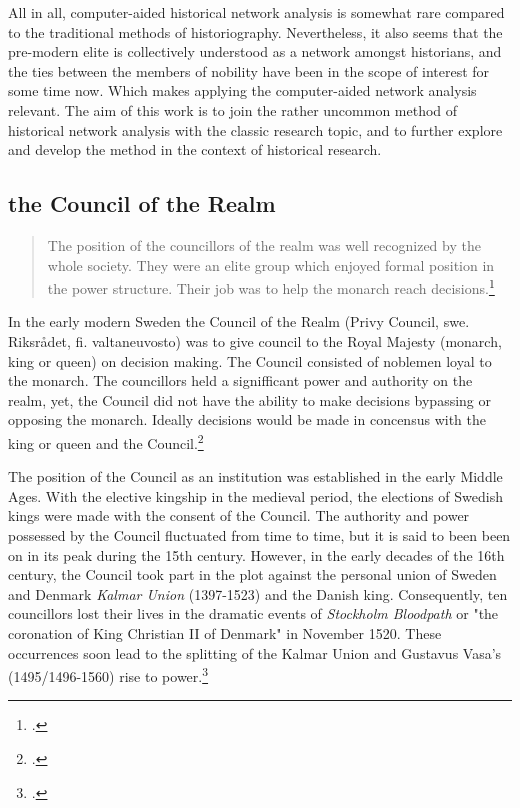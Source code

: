 All in all, computer-aided historical network analysis is somewhat rare compared to the traditional methods of historiography. Nevertheless, it also seems that the pre-modern elite is collectively understood as a network amongst historians, and the ties between the members of nobility have been in the scope of interest for some time now. Which makes applying the computer-aided network analysis relevant. The aim of this work is to join the rather uncommon method of historical network analysis with the classic research topic, and to further explore and develop the method in the context of historical research.

\subsection{the Council of the Realm}
\label{councilofrealm}
\begin{quote}
	The position of the councillors of the realm was well recognized by the whole society. They were an elite group which enjoyed formal position in the power structure. Their job was to help the monarch reach decisions.\footcite[p. 26.]{agencyAndStateBuilding}
\end{quote}

In the early modern Sweden the Council of the Realm (Privy Council, swe. Riksrådet, fi. valtaneuvosto) was to give council to the Royal Majesty (monarch, king or queen) on decision making. The Council consisted of noblemen loyal to the monarch. The councillors held a signifficant power and authority on the realm, yet, the Council did not have the ability to make decisions bypassing or opposing the monarch. Ideally decisions would be made in concensus with the king or queen and the Council.\footcites[pp. 13-14,]{hopesAndFearsIntro}[pp. 47-50.]{HakanenAKoskinen2017}

The position of the Council as an institution was established in the early Middle Ages. With the elective kingship in the medieval period, the elections of Swedish kings were made with the consent of the Council. The authority and power possessed by the Council fluctuated from time to time, but it is said to been been on in its peak during the 15th century. However, in the early decades of the 16th century, the Council took part in the plot against the personal union of Sweden and Denmark \textit{Kalmar Union} (1397-1523) and the Danish king. Consequently, ten councillors lost their lives in the dramatic events of \textit{Stockholm Bloodpath} or "the coronation of King Christian II of Denmark" in November 1520. These occurrences soon lead to the splitting of the Kalmar Union and Gustavus Vasa's (1495/1496-1560) rise to power.\footcites[pp. 49-50,]{HakanenAKoskinen2017}[pp. 8-9.]{personalAgency}

